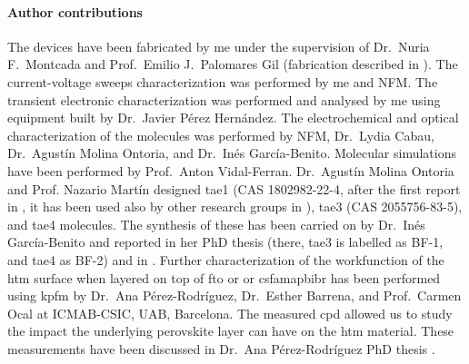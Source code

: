 \paragraph{Author contributions}
The devices have been fabricated by me under the supervision of Dr.\ Nuria F.\ Montcada and Prof.\ Emilio J.\ Palomares Gil (fabrication described in ).
The current\hyp{}voltage sweeps characterization was performed by me and NFM.
The transient electronic characterization was performed and analysed by me using equipment built by Dr.\ Javier Pérez Hernández.
The electrochemical and optical characterization of the molecules was performed by NFM, Dr.\ Lydia Cabau, Dr.\ Agustín Molina Ontoria, and Dr.\ Inés García\hyp{}Benito.
Molecular simulations have been performed by Prof.\ Anton Vidal\hyp{}Ferran.
Dr.\ Agustín Molina Ontoria and Prof. Nazario Martín designed \gls{tae1} (CAS 1802982-22-4, after the first report in \cite{Cabau2015a}, it has been used also by other research groups in \cite{Choi2015b,Labban2016,Wu2016a,Wu2016b}), \gls{tae3} (CAS 2055756-83-5), and \gls{tae4} molecules.
The synthesis of these has been carried on by Dr.\ Inés García\hyp{}Benito and reported in her PhD thesis \cite{Garcia-Benito2017} (there, \gls{tae3} is labelled as BF-1, and \gls{tae4} as BF-2) and in \cite{Gelmetti2019}.
Further characterization of the workfunction of the \gls{htm} surface when layered on top of \gls{fto} or  or \gls{csfamapbibr} has been performed using \gls{kpfm} by Dr.\ Ana Pérez-Rodríguez, Dr.\ Esther Barrena, and Prof.\ Carmen Ocal at ICMAB-CSIC, UAB, Barcelona.
The measured \gls{cpd} allowed us to study the impact the underlying perovskite layer can have on the \gls{htm} material.
These measurements have been discussed in Dr.\ Ana Pérez-Rodríguez PhD thesis \cite{Perez-Rodriguez2018}.

\begin{figure}
\end{figure}

